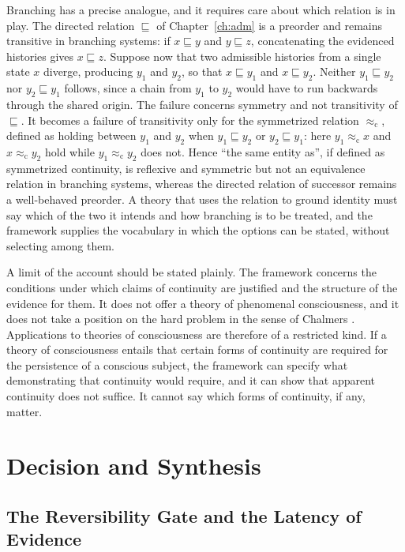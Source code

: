 \documentclass[11pt,twoside,openright]{book}
\theoremstyle{plain}
\theoremstyle{definition}
\theoremstyle{remark}
\begin{document}
Branching has a precise analogue, and it requires care about which relation is in play. The directed relation $\sqsubseteq$ of Chapter~\ref{ch:adm} is a preorder and remains transitive in branching systems: if $x\sqsubseteq y$ and $y\sqsubseteq z$, concatenating the evidenced histories gives $x\sqsubseteq z$. Suppose now that two admissible histories from a single state $x$ diverge, producing $y_1$ and $y_2$, so that $x\sqsubseteq y_1$ and $x\sqsubseteq y_2$. Neither $y_1\sqsubseteq y_2$ nor $y_2\sqsubseteq y_1$ follows, since a chain from $y_1$ to $y_2$ would have to run backwards through the shared origin. The failure concerns symmetry and not transitivity of $\sqsubseteq$. It becomes a failure of transitivity only for the symmetrized relation $\approx_{\mathrm{c}}$, defined as holding between $y_1$ and $y_2$ when $y_1\sqsubseteq y_2$ or $y_2\sqsubseteq y_1$: here $y_1\approx_{\mathrm{c}}x$ and $x\approx_{\mathrm{c}}y_2$ hold while $y_1\approx_{\mathrm{c}}y_2$ does not. Hence ``the same entity as'', if defined as symmetrized continuity, is reflexive and symmetric but not an equivalence relation in branching systems, whereas the directed relation of successor remains a well-behaved preorder. A theory that uses the relation to ground identity must say which of the two it intends and how branching is to be treated, and the framework supplies the vocabulary in which the options can be stated, without selecting among them.

A limit of the account should be stated plainly. The framework concerns the conditions under which claims of continuity are justified and the structure of the evidence for them. It does not offer a theory of phenomenal consciousness, and it does not take a position on the hard problem in the sense of Chalmers \cite{chalmers1995}. Applications to theories of consciousness are therefore of a restricted kind. If a theory of consciousness entails that certain forms of continuity are required for the persistence of a conscious subject, the framework can specify what demonstrating that continuity would require, and it can show that apparent continuity does not suffice. It cannot say which forms of continuity, if any, matter.
\part{Decision and Synthesis}

\chapter{The Reversibility Gate and the Latency of Evidence}
\label{ch:gate}
\end{document}
